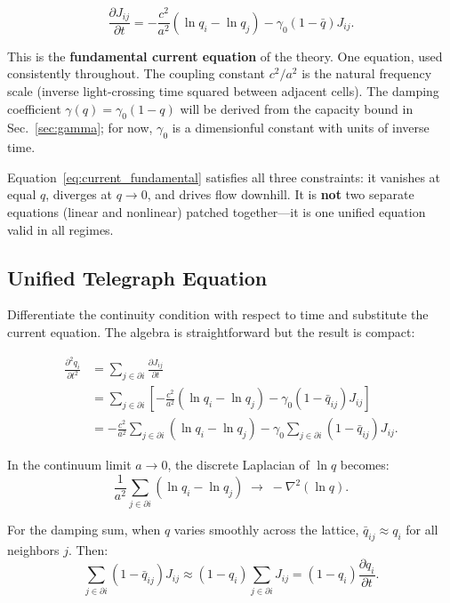 \documentclass[aps,prd,twocolumn,showpacs,superscriptaddress,preprintnumbers]{revtex4-2}
\begin{document}
\begin{equation}
\boxed{\frac{\partial J_{ij}}{\partial t} = -\frac{c^2}{a^2}(\ln q_i - \ln q_j) - \gamma_0(1-\bar{q})J_{ij}}.
\label{eq:current_fundamental}
\end{equation}

This is the \textbf{fundamental current equation} of the theory.
One equation, used consistently throughout.
The coupling constant $c^2/a^2$ is the natural frequency scale (inverse light-crossing time squared between adjacent cells).
The damping coefficient $\gamma(q)=\gamma_0(1-q)$ will be derived from the capacity bound in Sec.~\ref{sec:gamma}; for now, $\gamma_0$ is a dimensionful constant with units of inverse time.

Equation~\eqref{eq:current_fundamental} satisfies all three constraints: it vanishes at equal $q$, diverges at $q\to0$, and drives flow downhill.
It is \textbf{not} two separate equations (linear and nonlinear) patched together---it is one unified equation valid in all regimes.

\subsection{Unified Telegraph Equation}

Differentiate the continuity condition with respect to time and substitute the current equation.
The algebra is straightforward but the result is compact:

\begin{align}
\frac{\partial^2 q_i}{\partial t^2} &= \sum_{j \in \partial i} \frac{\partial J_{ij}}{\partial t} \nonumber \\
&= \sum_{j \in \partial i} \left[-\frac{c^2}{a^2}(\ln q_i - \ln q_j) - \gamma_0(1-\bar{q}_{ij})J_{ij}\right] \nonumber \\
&= -\frac{c^2}{a^2} \sum_{j \in \partial i} (\ln q_i - \ln q_j) - \gamma_0 \sum_{j \in \partial i}(1-\bar{q}_{ij})J_{ij}.
\label{eq:telegraph_step}
\end{align}

In the continuum limit $a\to0$, the discrete Laplacian of $\ln q$ becomes:
\begin{equation}
\frac{1}{a^2}\sum_{j \in \partial i}(\ln q_i - \ln q_j) \;\longrightarrow\; -\nabla^2(\ln q).
\end{equation}

For the damping sum, when $q$ varies smoothly across the lattice, $\bar{q}_{ij}\approx q_i$ for all neighbors $j$.
Then:
\begin{equation}
\sum_{j \in \partial i}(1-\bar{q}_{ij})J_{ij} \approx (1-q_i)\sum_{j \in \partial i}J_{ij} = (1-q_i)\frac{\partial q_i}{\partial t}.
\end{equation}
\end{document}
